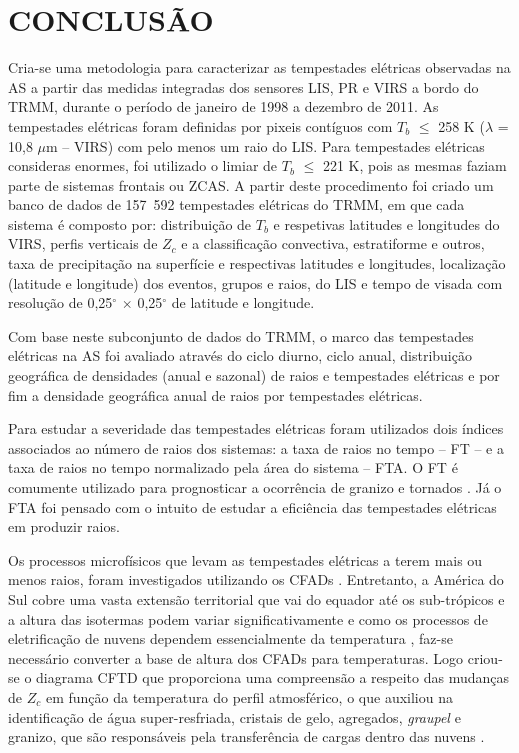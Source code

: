 \chapter{CONCLUSÃO}

Cria-se uma metodologia para caracterizar as tempestades elétricas observadas na AS a partir das medidas integradas dos sensores LIS, PR e VIRS a bordo do TRMM, durante o período de janeiro de 1998 a dezembro de 2011. As tempestades elétricas foram definidas por pixeis contíguos com $T_b$ $\leq$ 258 K ($\lambda$ = 10,8 $\mu$m -- VIRS) com pelo menos um raio do LIS. Para tempestades elétricas consideras enormes, foi utilizado o limiar de $T_b$ $\leq$ 221 K, pois as mesmas faziam parte de sistemas frontais ou ZCAS. A partir deste procedimento foi criado um banco de dados de 157~592 tempestades elétricas do TRMM, em que cada sistema é composto por: distribuição de $T_b$ e respetivas latitudes e longitudes do VIRS, perfis verticais de $Z_c$ e a classificação convectiva, estratiforme e outros, taxa de precipitação na superfície e respectivas latitudes e longitudes, localização (latitude e longitude) dos eventos, grupos e raios, do LIS e tempo de visada com resolução de 0,25$^{\circ}$ $\times$ 0,25$^{\circ}$ de latitude e longitude.

Com base neste subconjunto de dados do TRMM, o marco das tempestades elétricas na AS foi avaliado através  do ciclo diurno, ciclo anual, distribuição geográfica de densidades (anual e sazonal) de raios e tempestades elétricas e por fim a densidade geográfica anual de raios por tempestades elétricas.  

Para estudar a severidade das tempestades elétricas foram utilizados dois índices associados ao número de raios dos sistemas: a taxa de raios no tempo -- FT -- e a taxa de raios no tempo normalizado pela área do sistema -- FTA. O FT é comumente utilizado  para prognosticar a ocorrência de granizo e tornados \cite{williams1999,goodman1988,schultz2011,gatlin2010}. Já o FTA foi pensado com o intuito de estudar a eficiência das tempestades elétricas em produzir raios. 


Os processos microfísicos que levam as tempestades elétricas a terem mais ou menos raios, foram investigados utilizando os CFADs \cite{yuter1995}. Entretanto, a América do Sul cobre uma vasta extensão territorial que vai do equador até os sub-trópicos e a altura das isotermas podem variar significativamente e como os processos de eletrificação de nuvens  dependem essencialmente da temperatura \cite{Takahashi1978}, faz-se necessário converter a base de altura dos CFADs para temperaturas. Logo criou-se o diagrama CFTD que proporciona uma compreensão a respeito das mudanças de $Z_c$ em função da temperatura do perfil atmosférico, o que auxiliou na identificação de água super-resfriada, cristais de gelo, agregados, \textit{graupel} e granizo, que são responsáveis pela transferência de cargas dentro das nuvens \cite{Takahashi1978,saunders2008}.


